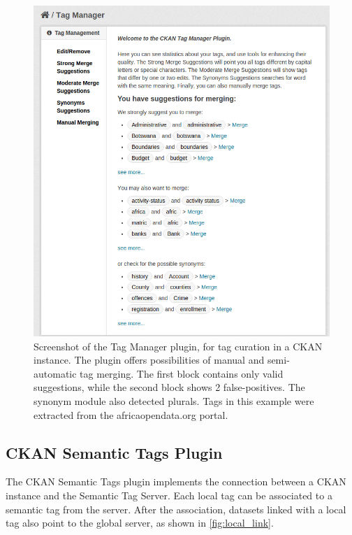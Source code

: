\begin{figure}[h]
\begin{center}
\includegraphics[width=\columnwidth]{images/local_curation.png}
\caption[Screenshot of the Tag Manager plugin.]{Screenshot of the Tag Manager plugin, for tag curation in a CKAN instance. The plugin offers possibilities of manual and semi-automatic tag merging. The first block contains only valid suggestions, while the second block shows 2 false-positives. The synonym module also detected plurals. Tags in this example were extracted from the africaopendata.org portal.}
\label{fig:local_curation}
\end{center}
\end{figure}

\subsection{CKAN Semantic Tags Plugin}

The CKAN Semantic Tags plugin implements the connection between a CKAN instance and the Semantic Tag Server.
Each local tag can be associated to a semantic tag from the server.
After the association, datasets linked with a local tag also point to the global server, as shown in \autoref{fig:local_link}.

